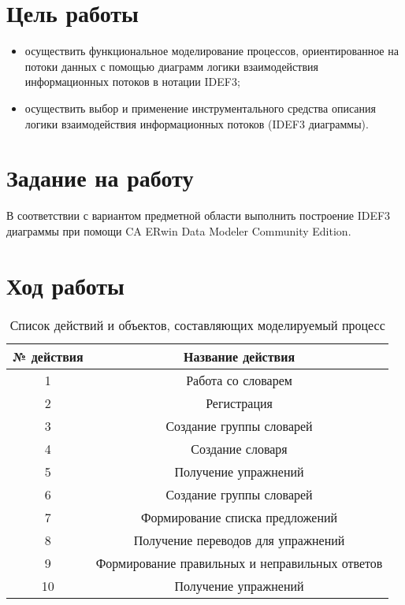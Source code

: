 \documentclass[a4paper,14pt]{extarticle}
\begin{document}


\section{Цель работы}
\begin{itemize}
    \item осуществить функциональное моделирование процессов, ориентированное на
          потоки данных с помощью диаграмм логики взаимодействия информационных
          потоков в нотации IDEF3;
    \item осуществить выбор и применение инструментального средства описания
          логики взаимодействия информационных потоков (IDEF3 диаграммы).
\end{itemize}

\section{Задание на работу}
В соответствии с вариантом предметной области выполнить построение IDEF3
диаграммы при помощи CA ERwin Data Modeler Community Edition.

\section{Ход работы}
\begin{table}[H]
    \caption{Список действий и объектов, составляющих моделируемый процесс}
    \begin{tabular}{| c | c |}
        \hline
        № действия & Название действия \\ \hline
        1 & Работа со словарем \\ \hline
        2 & Регистрация \\ \hline
        3 & Создание группы словарей \\ \hline
        4 & Создание словаря \\ \hline
        5 & Получение упражнений \\ \hline
        6 & Создание группы словарей \\ \hline
        7 & Формирование списка предложений \\ \hline
        8 & Получение переводов для упражнений \\ \hline
        9 & Формирование правильных и неправильных ответов \\ \hline
        10 & Получение упражнений \\ \hline
    \end{tabular}
\end{table}
\end{document}
